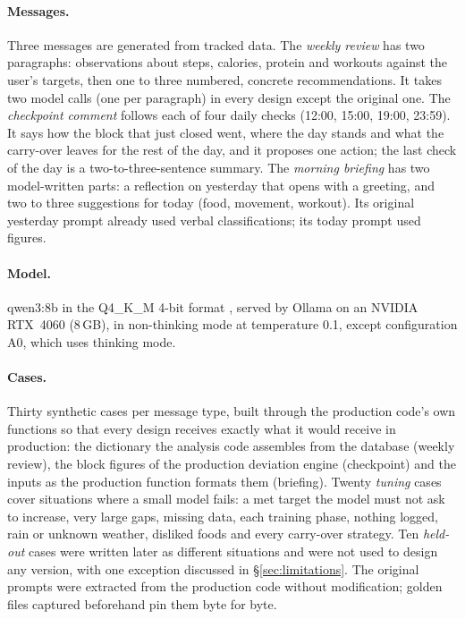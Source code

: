 \documentclass[10pt,twocolumn]{article}
\begin{document}
\paragraph{Messages.} Three messages are generated from tracked data.
The \emph{weekly review} has two paragraphs: observations about steps, calories, protein and workouts against the
user's targets, then one to three numbered, concrete recommendations. It takes two model calls (one per paragraph) in
every design except the original one.
The \emph{checkpoint comment} follows each of four daily checks (12:00, 15:00, 19:00, 23:59). It says how the block
that just closed went, where the day stands and what the carry-over leaves for the rest of the day, and it proposes
one action; the last check of the day is a two-to-three-sentence summary.
The \emph{morning briefing} has two model-written parts: a reflection on yesterday that opens with a greeting, and two
to three suggestions for today (food, movement, workout). Its original yesterday prompt already used verbal
classifications; its today prompt used figures.

\paragraph{Model.} qwen3:8b \citep{qwen3} in the Q4\_K\_M 4-bit format \citep{llamacpp}, served by Ollama
\citep{ollama} on an NVIDIA RTX~4060 (8\,GB), in non-thinking mode at temperature 0.1, except configuration A0,
which uses thinking mode.

\paragraph{Cases.} Thirty synthetic cases per message type, built through the production code's own functions so that
every design receives exactly what it would receive in production: the dictionary the analysis code assembles from
the database (weekly review), the block figures of the production deviation engine (checkpoint) and the inputs as
the production function formats them (briefing). Twenty \emph{tuning} cases cover situations where a small model
fails: a met target the model must not ask to increase, very large gaps, missing data, each training phase, nothing
logged, rain or unknown weather, disliked foods and every carry-over strategy. Ten \emph{held-out} cases were written
later as different situations and were not used to design any version, with one exception discussed in
\S\ref{sec:limitations}. The original prompts were extracted from the production code without modification; golden
files captured beforehand pin them byte for byte.
\end{document}
